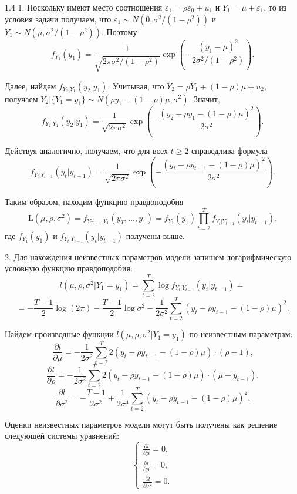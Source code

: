 \begin{solution}{{1.4}}
1. Поскольку имеют место соотношения $\varepsilon_1 = \rho \varepsilon_0 + u_1$ и $Y_1 =\mu + \varepsilon_1$, то из условия задачи получаем, что $\varepsilon_1 \sim N(0,\sigma^2 / (1 - \rho^2))$
и $Y_1 \sim N(\mu,\sigma^2 / (1 - \rho^2))$. Поэтому
\[
f_{Y_1}(y_1) = \frac{1}{\sqrt{2\pi\sigma^2/(1-\rho^2)}}\exp{\left(-\frac{(y_1 - \mu)^2}{2\sigma^2/(1 - \rho^2)}\right)}.
\]

Далее, найдем $f_{Y_2|Y_1}(y_2|y_1)$. Учитывая, что $Y_2 = \rho Y_1 + (1- \rho) \mu + u_2$, получаем $Y_2|\{Y_1 = y_1\} \sim N(\rho y_1 + (1- \rho) \mu, \sigma^2)$. Значит,
\[
f_{Y_2|Y_1}(y_2|y_1) = \frac{1}{\sqrt{2\pi\sigma^2}}\exp{\left(-\frac{(y_2 - \rho y_1 - (1- \rho) \mu)^2}{2\sigma^2}\right)}.
\]

Действуя аналогично, получаем, что для всех $t \geq 2$ справедлива формула
\[
f_{Y_{t}|Y_{t-1}}(y_{t}|y_{t-1}) = \frac{1}{\sqrt{2\pi\sigma^2}}\exp{\left(-\frac{(y_{t} - \rho y_{t-1} - (1- \rho) \mu)^2}{2\sigma^2}\right)}.
\]

Таким образом, находим функцию правдоподобия
\[
\mathrm{L}(\mu, \rho, \sigma^2) = f_{Y_T,\ldots,Y_1}(y_T,\dots,y_1) = f_{Y_1}(y_1)\prod_{t=2}^{T}f_{Y_t|Y_{t-1}}(y_t|y_{t-1}) \text{,}
\]
где $f_{Y_1}(y_1)$ и $f_{Y_t|Y_{t-1}}(y_t|y_{t-1})$ получены выше.

2. Для нахождения неизвестных параметров модели запишем логарифмическую условную функцию правдоподобия:
\[
l(\mu, \rho, \sigma^2|Y_1 = y_1) = \sum_{t=2}^{T}\log{f_{Y_t|Y_{t-1}}(y_t|y_{t-1})} =
\]
\[
=-\frac{T-1}{2} \log(2 \pi) - \frac{T-1}{2} \log{\sigma^2} - \frac{1}{2\sigma^2} \sum_{t=2}^{T}(y_t - \rho y_{t-1} - (1 - \rho) \mu)^2 \text{.}
\]

Найдем производные функции $l(\mu, \rho, \sigma^2|Y_1 = y_1)$ по неизвестным параметрам:
\[
\frac{\partial l}{\partial \mu} = -\frac{1}{2\sigma^2} \sum_{t=2}^{T} 2(y_t - \rho y_{t-1} - (1 - \rho) \mu) \cdot (\rho - 1) \text{,}
\]
\[
\frac{\partial l}{\partial \rho} = -\frac{1}{2\sigma^2} \sum_{t=2}^{T} 2(y_t - \rho y_{t-1} - (1 - \rho) \mu) \cdot (\mu - y_{t-1}) \text{,}
\]
\[
\frac{\partial l}{\partial {\sigma^2}} =  - \frac{T-1}{2\sigma^2} + \frac{1}{2\sigma^4} \sum_{t=2}^{T}(y_t - \rho y_{t-1} - (1 - \rho) \mu)^2 \text{.}
\]

Оценки неизвестных параметров модели могут быть получены как решение следующей системы уравнений:
\[
\left\{
  \begin{aligned}
    \frac{\partial l}{\partial \mu} = 0 \text{,} \\
    \frac{\partial l}{\partial \rho} = 0 \text{,} \\
    \frac{\partial l}{\partial {\sigma^2}} = 0 \text{.}
  \end{aligned}
\right.
\]


\end{solution}
